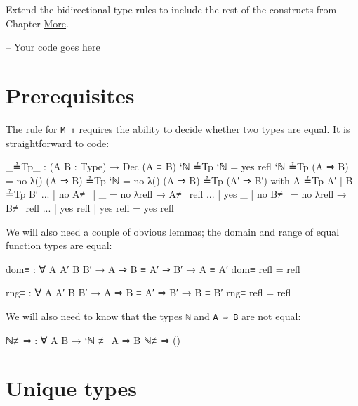 Extend the bidirectional type rules to include the rest of the
constructs from Chapter \protect\hyperlink{More}{More}.

\begin{fence}
\begin{code}
-- Your code goes here
\end{code}
\end{fence}

\hypertarget{prerequisites}{%
\section{Prerequisites}\label{prerequisites}}

The rule for \texttt{M\ ↑} requires the ability to decide whether two
types are equal. It is straightforward to code:

\begin{fence}
\begin{code}
_≟Tp_ : (A B : Type) → Dec (A ≡ B)
`ℕ      ≟Tp `ℕ              =  yes refl
`ℕ      ≟Tp (A ⇒ B)         =  no λ()
(A ⇒ B) ≟Tp `ℕ              =  no λ()
(A ⇒ B) ≟Tp (A′ ⇒ B′)
  with A ≟Tp A′ | B ≟Tp B′
...  | no A≢    | _         =  no λ{refl → A≢ refl}
...  | yes _    | no B≢     =  no λ{refl → B≢ refl}
...  | yes refl | yes refl  =  yes refl
\end{code}
\end{fence}

We will also need a couple of obvious lemmas; the domain and range of
equal function types are equal:

\begin{fence}
\begin{code}
dom≡ : ∀ {A A′ B B′} → A ⇒ B ≡ A′ ⇒ B′ → A ≡ A′
dom≡ refl = refl

rng≡ : ∀ {A A′ B B′} → A ⇒ B ≡ A′ ⇒ B′ → B ≡ B′
rng≡ refl = refl
\end{code}
\end{fence}

We will also need to know that the types \texttt{\textasciigrave{}ℕ} and
\texttt{A\ ⇒\ B} are not equal:

\begin{fence}
\begin{code}
ℕ≢⇒ : ∀ {A B} → `ℕ ≢ A ⇒ B
ℕ≢⇒ ()
\end{code}
\end{fence}

\hypertarget{unique-types}{%
\section{Unique types}\label{unique-types}}

